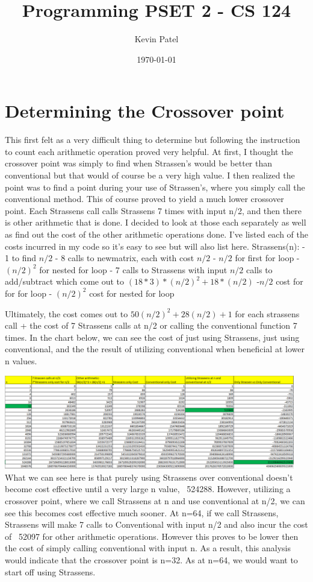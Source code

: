 \documentclass{amsart}
\title[CS124 Programming 2]{Programming PSET 2 - CS 124}
\author{Kevin Patel}
\date{\today}
\theoremstyle{definition}
\theoremstyle{remark}
\begin{document}
\maketitle
\section{Determining the Crossover point}
\flushleft
This first felt as a very difficult thing to determine but following the instruction to count each arithmetic operation proved very helpful. At first, I thought the crossover point was simply to find when Strassen's would be better than conventional but that would of course be a very high value. I then realized the point was to find a point during your use of Strassen's, where you simply call the conventional method. This of course proved to yield a much lower crossover point. Each Strassens call calls Strassens 7 times with input n/2, and then there is other arithmetic that is done. I decided to look at those each separately as well as find out the cost of the other arithmetic operations done. I've listed each of the costs incurred in my code so it's easy to see but will also list here. \break 
Strassens(n): \break
- 1 to find $n/2$\break
- 8 calls to newmatrix, each with cost $n/2$ \break
- $n/2$ for first for loop \break
-$(n/2)^2$ for nested for loop \break
- 7 calls to Strassens with input $n/2$ calls to add/subtract which come out to $(18*3)*(n/2)^2 + 18*(n/2)$ \break
-$n/2$ cost for for for loop \break
- $(n/2)^2$ cost for nested for loop \break

Ultimately, the cost comes out to $50(n/2)^2+28(n/2)+1$ for each strassens call + the cost of 7 Strassens calls at n/2 or calling the conventional function 7 times. In the chart below, we can see the cost of just using Strassens, just using conventional, and the the result of utilizing conventional when beneficial at lower n values.  \break

            \includegraphics[width = 5in]{cost.png}
\newpage
What we can see here is that purely using Strassens over conventional doesn't become cost effective until a very large n value, ~524288. However, utilizing a crossover point, where we call Strassens at n and use conventional at n/2, we can see this becomes cost effective much sooner. At n=64, if we call Strassens, Strassens will make 7 calls to Conventional with input n/2 and also incur the cost of ~52097 for other arithmetic operations. However this proves to be lower then the cost of simply calling conventional with input n. As a result, this analysis would indicate that the crossover point is n=32. As at n=64, we would want to start off using Strassens. 
\end{document}
